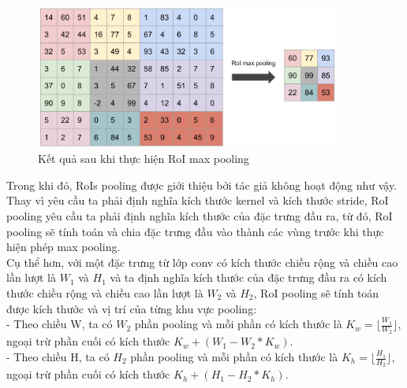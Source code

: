 {        \begin{figure}[H]
            \centering
            \includegraphics[width=10cm] {images/roi_pooling}
            \caption{Kết quả sau khi thực hiện RoI max pooling}
            \label{fig:roi_pooling}
        \end{figure}

        \noindent
        Trong khi đó, RoIs pooling được giới thiệu bởi tác giả không hoạt động như vậy.
        Thay vì yêu cầu ta phải định nghĩa kích thước kernel và kích thước stride, RoI pooling yêu cầu ta phải định nghĩa kích thước của đặc trưng đầu ra, từ đó, RoI pooling sẽ tính toán và chia đặc trưng đầu vào thành các vùng trước khi thực hiện phép max pooling. \\
        Cụ thể hơn, với một đặc trưng từ lớp conv có kích thước chiều rộng và chiều cao lần lượt là ${W}_{1}$ và ${H}_{1}$ và ta định nghĩa kích thước của đặc trưng đầu ra có kích thước chiều rộng và chiều cao lần lượt là ${W}_{2}$ và ${H}_{2}$, RoI pooling sẽ tính toán được kích thước và vị trí của từng khu vực pooling: \\
        - Theo chiều W, ta có ${W}_{2}$ phần pooling và mỗi phần có kích thước là ${K}_{w} = \lfloor\frac{{W}_{1}}{{W}_{2}}\rfloor$, ngoại trừ phần cuối có kích thước ${K}_{w} + ({W}_{1} - {W}_{2} * {K}_{w})$. \\
        - Theo chiều H, ta có ${H}_{2}$ phần pooling và mỗi phần có kích thước là ${K}_{h} = \lfloor\frac{{H}_{1}}{{H}_{2}}\rfloor$, ngoại trừ phần cuối có kích thước ${K}_{h} + ({H}_{1} - {H}_{2} * {K}_{h})$. \\

}

